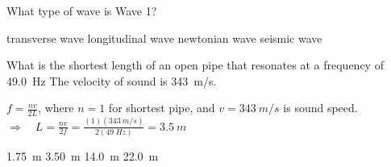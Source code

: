 \documentclass[answers]{exam}
\begin{document}
\begin{questions}
\question \label{transverse-wave}
What type of wave is Wave 1?

\begin{randomizechoices}
    \choice transverse wave
    \correctchoice longitudinal wave
    \choice newtonian wave
    \choice seismic wave
\end{randomizechoices}


\question
What is the shortest length of an open pipe that resonates at a frequency of \SI{49.0}{Hz} The velocity of sound is \SI{343}{m/s}.

\begin{center}
\end{center}

\ifprintanswers
{\color{red}
$f = \frac{nv}{2L}$, where $n=1$ for shortest pipe, and $v = \SI{343}{m/s}$ is sound speed. $\Rightarrow \quad L = \frac{nv}{2f} = \frac{(1)(\SI{343}{m/s})}{2(\SI{49}{Hz})} = \boxed{\SI{3.5}{m}}$
}
\fi

\begin{randomizechoices}
    \choice \SI{1.75}{m}
    \correctchoice \SI{3.50}{m}
    \choice \SI{14.0}{m}
    \choice \SI{22.0}{m}
\end{randomizechoices}





\end{questions}
\end{document}
